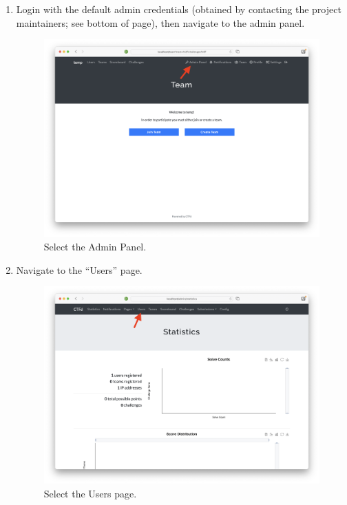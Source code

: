 \documentclass[11pt]{article}
\begin{document}
\begin{enumerate}
	
	\item Login with the default admin credentials (obtained by contacting the project maintainers; see bottom of page), then navigate to the admin panel.
	
	\begin{figure}[H]
		\centering
	   \includegraphics[width=\textwidth]{point_to_admin_panel.png}
  	   \caption{Select the Admin Panel.}
	\end{figure}
	
	\item Navigate to the ``Users'' page.
	
	\begin{figure}[H]
		\centering
	   \includegraphics[width=\textwidth]{admin_panel_point_to_users.png}
  	   \caption{Select the Users page.}
	\end{figure}
	

\end{enumerate}
\end{document}
